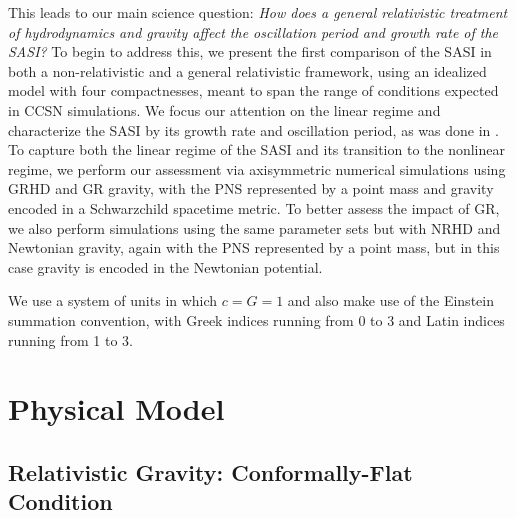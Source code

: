 This leads to our main science question:
\emph{How does a general relativistic treatment of hydrodynamics and gravity
affect the oscillation period and growth rate
of the SASI?}
To begin to address this, we
present the first comparison of the SASI in both a non-relativistic
and a general relativistic framework, using an idealized model
{with four compactnesses, meant to span the range of conditions
expected in CCSN simulations.}
We focus our attention on the linear regime and characterize the SASI by its
growth rate and oscillation period, as was done in \citet{bm2006}.
To capture both the linear regime of the SASI and its transition to the
nonlinear regime,
we perform our assessment via  axisymmetric numerical
simulations
using GRHD and GR gravity, with the PNS represented by a point mass
and gravity encoded in a Schwarzchild spacetime metric.
To better assess the impact of GR, we also perform simulations
using the same parameter sets but
with NRHD and Newtonian gravity, again with the PNS represented by a point
mass, but in this case gravity is encoded in the Newtonian potential.

We use a system of units in which $c=G=1$ and also make use of the Einstein
summation convention, with Greek indices running from 0 to 3 and Latin indices
running from 1 to 3.

\section{Physical Model}

\subsection{Relativistic Gravity: Conformally-Flat Condition}

